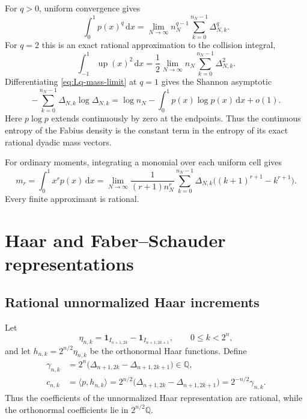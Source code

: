 \documentclass[11pt,oneside]{article}
\theoremstyle{definition}
\theoremstyle{remark}
\newcommand{\Q}{\mathbb Q}
\newcommand{\Up}{\operatorname{up}}
\newcommand{\dd}{\,\mathrm d}
\newcommand{\one}{\mathbf 1}
\begin{document}
For $q>0$, uniform convergence gives
\begin{equation}\label{eq:Lq-mass-limit}
 \int_0^1p(x)^q\dd x
 =\lim_{N\to\infty}n_N^{q-1}
  \sum_{k=0}^{n_N-1}\Delta_{N,k}^q.
\end{equation}
For $q=2$ this is an exact rational approximation to the collision integral,
\begin{equation}\label{eq:up-L2-masses}
 \int_{-1}^1\Up(x)^2\dd x
 =\frac12\lim_{N\to\infty}n_N
  \sum_{k=0}^{n_N-1}\Delta_{N,k}^2.
\end{equation}
Differentiating \eqref{eq:Lq-mass-limit} at $q=1$ gives the Shannon asymptotic
\begin{equation}\label{eq:mass-entropy}
 -\sum_{k=0}^{n_N-1}\Delta_{N,k}\log\Delta_{N,k}
 =\log n_N-\int_0^1p(x)\log p(x)\dd x+o(1).
\end{equation}
Here $p\log p$ extends continuously by zero at the endpoints.  Thus the
continuous entropy of the Fabius density is the constant term in the entropy of
its exact rational dyadic mass vectors.

For ordinary moments, integrating a monomial over each uniform cell gives
\begin{equation}\label{eq:moment-cell-limit-clean}
 m_r=\int_0^1x^rp(x)\dd x
 =\lim_{N\to\infty}
 \frac{1}{(r+1)n_N^{r}}
 \sum_{k=0}^{n_N-1}\Delta_{N,k}
 \bigl((k+1)^{r+1}-k^{r+1}\bigr).
\end{equation}
Every finite approximant is rational.

\section{Haar and Faber--Schauder representations}
\label{sec:haar-schauder}

\subsection{Rational unnormalized Haar increments}

Let
\begin{equation}\label{eq:eta-haar}
 \eta_{n,k}
 =\one_{I_{n+1,2k}}-\one_{I_{n+1,2k+1}},
 \qquad 0\le k<2^n,
\end{equation}
and let $h_{n,k}=2^{n/2}\eta_{n,k}$ be the orthonormal Haar functions.
Define
\begin{align}
 \gamma_{n,k}
 &=2^n\bigl(\Delta_{n+1,2k}-\Delta_{n+1,2k+1}\bigr)\in\Q,
 \label{eq:gamma-rational}\\
 c_{n,k}
 &=\langle p,h_{n,k}\rangle
 =2^{n/2}\bigl(\Delta_{n+1,2k}-\Delta_{n+1,2k+1}\bigr)
 =2^{-n/2}\gamma_{n,k}.
 \label{eq:c-orthonormal}
\end{align}
Thus the coefficients of the unnormalized Haar representation are rational,
while the orthonormal coefficients lie in $2^{n/2}\Q$.
\end{document}
